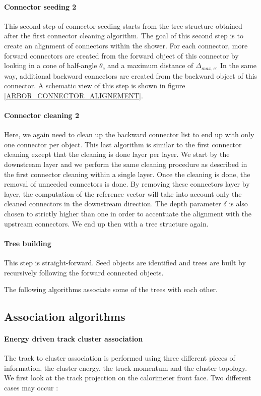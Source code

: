 \documentclass[12pt]{article}
\begin{document}
\paragraph*{Connector seeding 2} This second step of connector seeding starts from the tree structure obtained after the first connector cleaning algorithm. The goal of this second step is to create an alignment of connectors within the shower. For each connector, more forward connectors are created from the forward object of this connector by looking in a cone of half-angle $\theta_c$ and a maximum distance of $\Delta_{max,c}$. In the same way, additional backward connectors are created from the backward object of this connector. A schematic view of this step is shown in figure \ref{ARBOR_CONNECTOR_ALIGNEMENT}.

\paragraph*{Connector cleaning 2} Here, we again need to clean up the backward connector list to end up with only one connector per object. This last algorithm is similar to the first connector cleaning except that the cleaning is done layer per layer.  We start by the downstream layer and we perform the same cleaning procedure as described in the first connector cleaning within a single layer. Once the cleaning is done, the removal of unneeded connectors is done. By removing these connectors layer by layer, the computation of the reference vector will take into account only the cleaned connectors in the downstream direction. The depth parameter $\delta$ is also chosen to strictly higher than one in order to accentuate the alignment with the upstream connectors. We end up then with a tree structure again.

\paragraph*{Tree building} This step is straight-forward. Seed objects are identified and trees are built by recursively following the forward connected objects.


The following algorithms associate some of the trees with each other.

\subsection{Association algorithms}

\paragraph*{Energy driven track cluster association} The track to cluster association is performed using three different pieces of information, the cluster energy, the track momentum and the cluster topology. We first look at the track projection on the calorimeter front face. Two different cases may occur :
\end{document}
